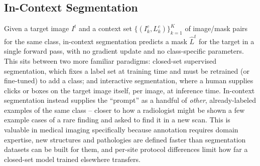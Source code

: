 \subsection{In-Context Segmentation}\label{sec:fundamentals-icl}

Given a target image $I^t$ and a context set
$\{(I^c_k, L^c_k)\}_{k=1}^{K}$ of image/mask pairs for the same class,
in-context segmentation predicts a mask $\hat{L}^t$ for the target in a
single forward pass, with no gradient update and no class-specific
parameters. This sits between two more familiar paradigms: closed-set
supervised segmentation, which fixes a label set at training time and
must be retrained (or fine-tuned) to add a class; and interactive
segmentation, where a human supplies clicks or boxes on the target image
itself, per image, at inference time. In-context segmentation instead
supplies the ``prompt'' as a handful of \emph{other}, already-labeled
examples of the same class -- closer to how a radiologist might be shown
a few example cases of a rare finding and asked to find it in a new scan.
This is valuable in medical imaging specifically because annotation
requires domain expertise, new structures and pathologies are defined
faster than segmentation datasets can be built for them, and per-site
protocol differences limit how far a closed-set model trained elsewhere
transfers.
